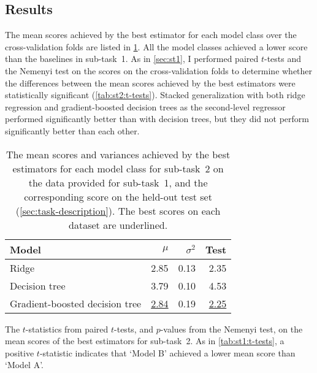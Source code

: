 \documentclass[11pt]{extarticle}
\begin{document}
\subsection{Results}
\label{sec:st2:results}

The mean scores achieved by the best estimator for each model class over the
cross-validation folds are listed in \cref{tab:st2:results}.
All the model classes achieved a lower score than the baselines in sub-task~1.
As in \cref{sec:st1}, I performed paired $t$-tests and the Nemenyi test on the scores
on the cross-validation folds to determine whether the differences between the mean
scores achieved by the best estimators were statistically significant
(\cref{tab:st2:t-tests}).
Stacked generalization with both ridge regression and gradient-boosted decision trees
as the second-level regressor performed significantly better than with decision trees,
but they did not perform significantly better than each other.

\begin{table}
  \centering
  \begin{tabular}{lrrr}
    \toprule
    Model                          & $\mu$            & $\sigma^2$ & Test
    \\
    \midrule
    Ridge                          & 2.85             & 0.13       & 2.35
    \\
    Decision tree                  & 3.79             & 0.10       & 4.53
    \\
    Gradient-boosted decision tree & \underline{2.84} & 0.19       & \underline{2.25}
    \\
    \bottomrule
  \end{tabular}
  \caption{The mean scores and variances achieved by the best estimators for each model
    class for sub-task~2 on the data provided for sub-task~1, and the corresponding score
    on the held-out test set (\cref{sec:task-description}).
    The best scores on each dataset are underlined.
  }
  \label{tab:st2:results}
\end{table}

\begin{table}
  \centering
  \caption{The $t$-statistics from paired $t$-tests, and $p$-values from the Nemenyi test, on the
    mean scores of the best estimators for sub-task~2.
    As in \cref{tab:st1:t-tests}, a positive $t$-statistic indicates that `Model B'
    achieved a lower mean score than `Model A'.
  }
  \label{tab:st2:t-tests}
\end{table}
\end{document}
